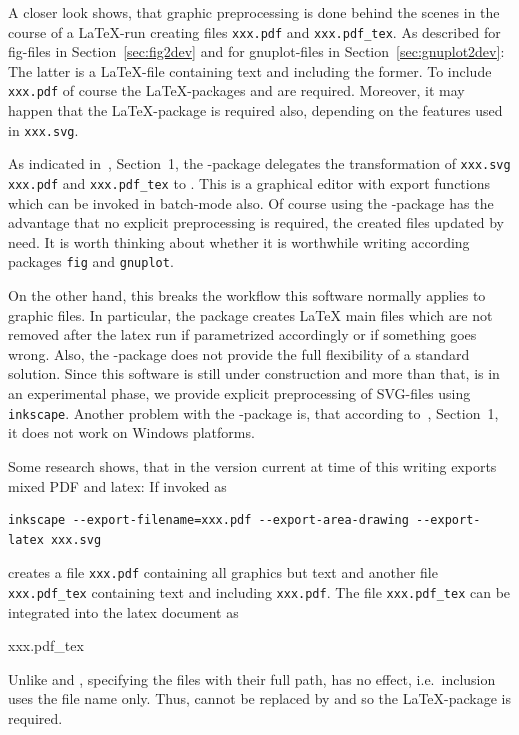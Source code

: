 A closer look shows, that graphic preprocessing is done behind the scenes 
in the course of a \LaTeX-run 
creating files \texttt{xxx.pdf} and \texttt{xxx.pdf\_tex}. 
As described for fig-files in Section~\ref{sec:fig2dev} 
and for gnuplot-files in Section~\ref{sec:gnuplot2dev}: 
The latter is a \LaTeX-file containing text 
and including the former. 
To include \texttt{xxx.pdf} 
of course the \LaTeX-packages  and  
are required. 
Moreover, it may happen that the \LaTeX-package  
is required also, depending on the features used in \texttt{xxx.svg}. 

As indicated in~\cite{SvgP}, Section~1, 
the -package delegates the transformation 
of \texttt{xxx.svg} \texttt{xxx.pdf} and \texttt{xxx.pdf\_tex} 
to . 
This is a graphical editor with export functions 
which can be invoked in batch-mode also. 
Of course using the -package has the advantage 
that no explicit preprocessing is required, 
the created files updated by need. 
It is worth thinking about whether it is worthwhile 
writing according packages \texttt{fig} and \texttt{gnuplot}. 

On the other hand, 
this breaks the workflow this software normally applies to graphic files. 
In particular, the package creates \LaTeX{} main files 
which are not removed after the latex run 
if parametrized accordingly or if something goes wrong. 
Also, the -package does not provide the full flexibility 
of a standard solution. 
Since this software is still under construction 
and more than that, is in an experimental phase, 
we provide explicit preprocessing of SVG-files using \texttt{inkscape}. 
Another problem with the -package is, 
that according to~\cite{SvgP}, Section~1, 
it does not work on Windows platforms. 


Some research shows,
that  in the version current at time of this writing
exports mixed PDF and latex: If invoked as 
%
\begin{Verbatim}[fontsize=\footnotesize]
inkscape --export-filename=xxx.pdf --export-area-drawing --export-latex xxx.svg 
\end{Verbatim}
%
 creates a file \texttt{xxx.pdf}
containing all graphics but text and another file \texttt{xxx.pdf\_tex}
containing text and including \texttt{xxx.pdf}.
The file \texttt{xxx.pdf\_tex}
can be integrated into the latex document as
%
\begin{taglstlisting}[language=TeX]
\def\svgwidth{0.5\textwidth}
{xxx.pdf\_tex}%
\end{taglstlisting}
%
Unlike  and , 
specifying the files with their full path, 
has no effect, i.e.~inclusion uses the file name only. 
Thus,  cannot be replaced by  
and so the \LaTeX-package  is required. 
 

